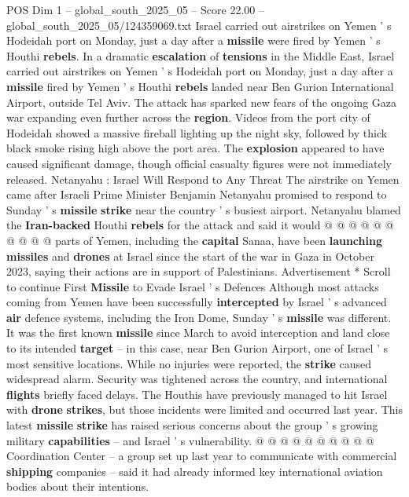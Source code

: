 \begin{textsample}{POS Dim 1 – global\_south\_2025\_05 – Score 22.00 – global\_south\_2025\_05/124359069.txt}  \label{ex:f1_pos_282}
Israel carried out airstrikes on Yemen ' s Hodeidah port on Monday, just a day after a \textbf{missile} were fired by Yemen ' s Houthi \textbf{rebels}.
In a dramatic \textbf{escalation} of \textbf{tensions} in the Middle East, Israel carried out airstrikes on Yemen ' s Hodeidah port on Monday, just a day after a \textbf{missile} fired by Yemen ' s Houthi \textbf{rebels} landed near Ben Gurion International Airport, outside Tel Aviv.
The attack has sparked new fears of the ongoing Gaza war expanding even further across the \textbf{region}.
Videos from the port city of Hodeidah showed a massive fireball lighting up the night sky, followed by thick black smoke rising high above the port area.
The \textbf{explosion} appeared to have caused significant damage, though official casualty figures were not immediately released.
Netanyahu : Israel Will Respond to Any Threat The airstrike on Yemen came after Israeli Prime Minister Benjamin Netanyahu promised to respond to Sunday ' s \textbf{missile} \textbf{strike} near the country ' s busiest airport.
Netanyahu blamed the \textbf{Iran-backed} Houthi \textbf{rebels} for the attack and said it would @ @ @ @ @ @ @ @ @ @ parts of Yemen, including the \textbf{capital} Sanaa, have been \textbf{launching} \textbf{missiles} and \textbf{drones} at Israel since the start of the war in Gaza in October 2023, saying their actions are in support of Palestinians.
Advertisement * Scroll to continue First \textbf{Missile} to Evade Israel ' s Defences Although most attacks coming from Yemen have been successfully \textbf{intercepted} by Israel ' s advanced \textbf{air} defence systems, including the Iron Dome, Sunday ' s \textbf{missile} was different.
It was the first known \textbf{missile} since March to avoid interception and land close to its intended \textbf{target} -- in this case, near Ben Gurion Airport, one of Israel ' s most sensitive locations.
While no injuries were reported, the \textbf{strike} caused widespread alarm.
Security was tightened across the country, and international \textbf{flights} briefly faced delays.
The Houthis have previously managed to hit Israel with \textbf{drone} \textbf{strikes}, but those incidents were limited and occurred last year.
This latest \textbf{missile} \textbf{strike} has raised serious concerns about the group ' s growing military \textbf{capabilities} -- and Israel ' s vulnerability. @ @ @ @ @ @ @ @ @ @ Coordination Center -- a group set up last year to communicate with commercial \textbf{shipping} companies -- said it had already informed key international aviation bodies about their intentions.

\end{textsample}
